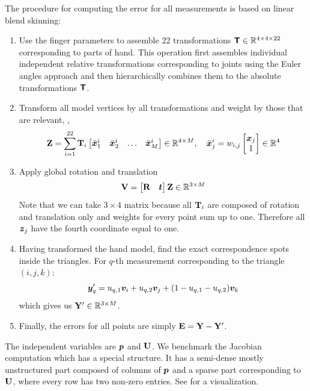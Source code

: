 \documentclass[suppldata]{article}
\begin{document}
The procedure for computing the error for all measurements is based on linear blend skinning:
\begin{enumerate}
    \item Use the finger parameters to assemble 22 transformations $\bm{\mathsf T} \in {\mathbb R}^{4 \times 4 \times 22}$  corresponding to parts of hand. This operation first assembles individual independent relative transformations corresponding to joints using the Euler angles approach and then hierarchically combines them to the absolute transformations $\bm{\mathsf T}$. 
    \item Transform all model vertices by all transformations and weight by those that are relevant, \ie, 
    \begin{equation}
    {\bf Z} = \sum_{i=1}^{22}{{\bf T}_i \begin{bmatrix} \bar{\bm{x}}_1^i & \bar{\bm{x}}_2^i & \hdots & \bar{\bm{x}}_M^i \end{bmatrix}} \in {\mathbb R}^{4 \times M}, \quad \bar{\bm{x}}_j^i = w_{i,j} \begin{bmatrix} \bm{x}_j \\ 1 \end{bmatrix} \in {\mathbb R}^{4}
    \end{equation}
    \item Apply global rotation and translation
    \begin{equation}
    {\bf V} = \begin{bmatrix} {\bf R} & \bm{t} \end{bmatrix} {\bf Z} \in {\mathbb R}^{3 \times M}
    \end{equation}
    Note that we can take $3 \times 4$ matrix because all ${\bf T}_i$ are composed of rotation and translation only and weights for every point sum up to one. Therefore all $\bm{z}_j$ have the fourth coordinate equal to one.
    \item Having transformed the hand model, find the exact correspondence spots inside the triangles. For $q$-th measurement corresponding to the triangle $(i,j,k)$:
    \begin{equation}
    \bm{y}'_q = u_{q,1} \bm{v}_i + u_{q,2} \bm{v}_j + (1 - u_{q,1} - u_{q,2}) \bm{v}_k
    \end{equation}
    which gives us ${\bf Y}' \in {\mathbb R}^{3 \times M}$.
    \item Finally, the errors for all points are simply ${\bf E} = {\bf Y} - {\bf Y}'$.
\end{enumerate}

The independent variables are $\bm{p}$ and ${\bf U}$. We benchmark the Jacobian computation which has a special structure. It has a semi-dense mostly unstructured part composed of columns of $\bm{p}$ and a sparse part corresponding to ${\bf U}$, where every row has two non-zero entries. See  for a visualization. 
\end{document}

